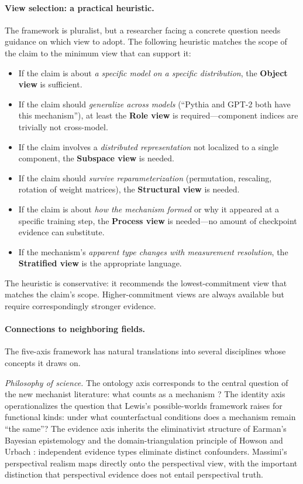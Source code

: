 \documentclass[11pt]{article}
\theoremstyle{remark}
\begin{document}
\paragraph{View selection: a practical heuristic.}
The framework is pluralist, but a researcher facing a concrete question
needs guidance on which view to adopt.  The following heuristic matches
the scope of the claim to the minimum view that can support it:
\begin{itemize}[leftmargin=*]
\item If the claim is about \emph{a specific model on a specific
      distribution}, the \textbf{Object view} is sufficient.
\item If the claim should \emph{generalize across models} (``Pythia and
      GPT-2 both have this mechanism''), at least the \textbf{Role view}
      is required---component indices are trivially not cross-model.
\item If the claim involves a \emph{distributed representation} not
      localized to a single component, the \textbf{Subspace view} is
      needed.
\item If the claim should \emph{survive reparameterization}
      (permutation, rescaling, rotation of weight matrices), the
      \textbf{Structural view} is needed.
\item If the claim is about \emph{how the mechanism formed} or why it
      appeared at a specific training step, the \textbf{Process view} is
      needed---no amount of checkpoint evidence can substitute.
\item If the mechanism's \emph{apparent type changes with measurement
      resolution}, the \textbf{Stratified view} is the appropriate
      language.
\end{itemize}
The heuristic is conservative: it recommends the lowest-commitment view
that matches the claim's scope.  Higher-commitment views are always
available but require correspondingly stronger evidence.

\paragraph{Connections to neighboring fields.}
The five-axis framework has natural translations into several disciplines
whose concepts it draws on.

\emph{Philosophy of science.}
The ontology axis corresponds to the central question of the new
mechanist literature: what counts as a mechanism
\citep{machamer2000,craver2007,illari2012,glennan1996}?  The identity
axis operationalizes the question that Lewis's possible-worlds
framework \citep{lewis1986} raises for functional kinds: under what
counterfactual conditions does a mechanism remain ``the same''?  The
evidence axis inherits the eliminativist structure of Earman's Bayesian
epistemology \citep{earman1992} and the domain-triangulation principle
of Howson and Urbach \citep{howson1989}: independent evidence types
eliminate distinct confounders.  Massimi's perspectival realism
\citep{massimi2022} maps directly onto the perspectival view, with
the important distinction that perspectival evidence does not entail
perspectival truth.
\end{document}
